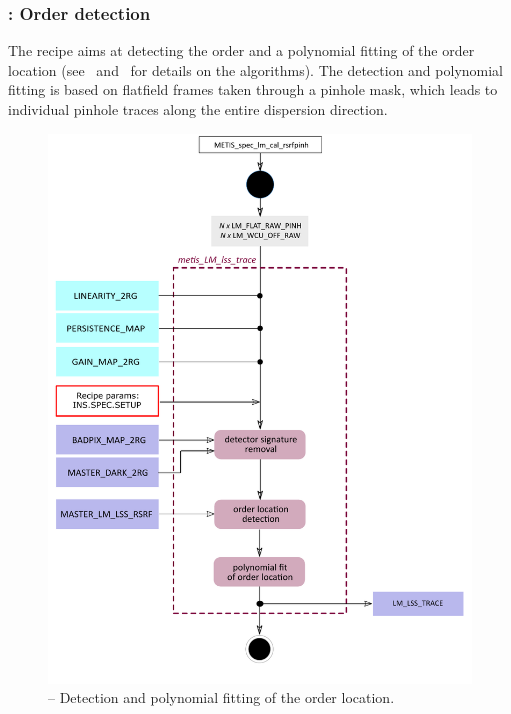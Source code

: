 \subsubsection{:  Order detection}\label{rec:metis_lm_lss_trace}
The recipe  aims at detecting the order and a polynomial fitting of the order location (see~\cite{pis02} and~\cite{pis21} for details on the algorithms). The detection and polynomial fitting is based on flatfield frames taken through a pinhole mask, which leads to individual pinhole traces along the entire dispersion direction.

\begin{figure}[ht]
  \centering
  \includegraphics[width=0.5\textheight]{figures/metis_lm_lss_trace_v0.84.pdf}
  \caption[Recipe: ]{ --
    Detection and polynomial fitting of the order location.}
  \label{Fig:rec_lm_lss_wtrace}
\end{figure}

